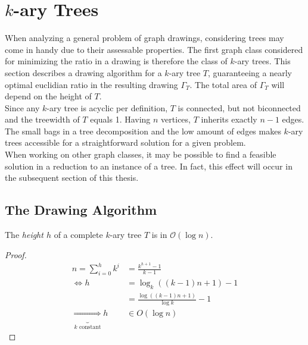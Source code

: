 \section{$k$-ary Trees}\label{s:k-ary_trees}
When analyzing a general problem of graph drawings, considering trees may come in handy due to their assessable properties. The first graph class considered for minimizing the ratio in a drawing is therefore the class of $k$-ary trees. This section describes a drawing algorithm for a $k$-ary tree $T$, guaranteeing a nearly optimal euclidian ratio in the resulting drawing $\Gamma_T$. The total area of $\Gamma_T$ will depend on the height of $T$.\\
Since any $k$-ary tree is acyclic per definition, $T$ is connected, but not biconnected and the treewidth of $T$ equals 1. Having $n$ vertices, $T$ inherits exactly $n-1$ edges. The small bags in a tree decomposition and the low amount of edges makes $k$-ary trees accessible for a straightforward solution for a given problem.\\
When working on other graph classes, it may be possible to find a feasible solution in a reduction to an instance of a tree. In fact, this effect will occur in the subsequent section of this thesis.
\subsection{The Drawing Algorithm}
\begin{lemma}The \emph{height $h$} of a complete $k$-ary tree $T$ is in $\mathcal{O}(\log n)$.\label{l:k-ary-tree_log_height}
\end{lemma}
\begin{proof}
	\begin{align}
		n = \sum_{i=0}^{h}k^i &= \frac{k^{h+1}-1}{k-1}\\
		\Leftrightarrow h &= \log_k((k-1)n+1)-1\\
		&= \frac{\log((k-1)n+1)}{\log k}-1\\
		\underbrace{\Rightarrow}_{k \text{ constant}}h &\in O(\log n)
	\end{align}
\end{proof}


